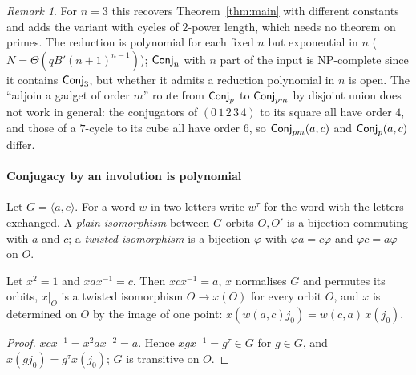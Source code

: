 \documentclass[preprint,12pt]{elsarticle}
\theoremstyle{definition}\newtheorem{defi}[thm]{Definition}\newtheorem{prob}[thm]{Problem}\newtheorem{obs}[thm]{Observation}
\theoremstyle{remark}\newtheorem{rem}[thm]{Remark}
\begin{document}
\begin{rem}
For $n=3$ this recovers Theorem~\ref{thm:main} with different constants and adds the variant with cycles of $2$-power length, which needs no
theorem on primes. The reduction is polynomial for each fixed $n$ but exponential in $n$ ($N=\Theta(qB'(n+1)^{n-1})$); $\mathsf{Conj}_{n}$ with $n$
part of the input is NP-complete since it contains $\mathsf{Conj}_{3}$, but whether it admits a reduction polynomial in $n$ is open. The ``adjoin a
gadget of order $m$'' route from $\mathsf{Conj}_{p}$ to $\mathsf{Conj}_{pm}$ by disjoint union does not work in general: the conjugators of $(0\,1\,2\,3\,4)$ to
its square all have order $4$, and those of a $7$-cycle to its cube all have order $6$, so $\mathsf{Conj}_{pm}(a,c)$ and $\mathsf{Conj}_{p}(a,c)$ differ.
\end{rem}

\paragraph{Conjugacy by an involution is polynomial}
Let $G=\langle a,c\rangle$. For a word $w$ in two letters write $w^{\tau}$ for the word with the letters exchanged. A \emph{plain isomorphism}
between $G$-orbits $O,O'$ is a bijection commuting with $a$ and $c$; a \emph{twisted isomorphism} is a bijection $\varphi$ with $\varphi a=c\varphi$
and $\varphi c=a\varphi$ on $O$.

\begin{lem}\label{lem:inv1}
Let $x^{2}=1$ and $xax^{-1}=c$. Then $xcx^{-1}=a$, $x$ normalises $G$ and permutes its orbits, $x|_O$ is a twisted isomorphism $O\to x(O)$ for
every orbit $O$, and $x$ is determined on $O$ by the image of one point: $x(w(a,c)j_0)=w(c,a)\,x(j_0)$.
\end{lem}
\begin{proof}
$xcx^{-1}=x^{2}ax^{-2}=a$. Hence $xgx^{-1}=g^{\tau}\in G$ for $g\in G$, and $x(gj_0)=g^{\tau}x(j_0)$; $G$ is transitive on $O$.
\end{proof}
\end{document}
